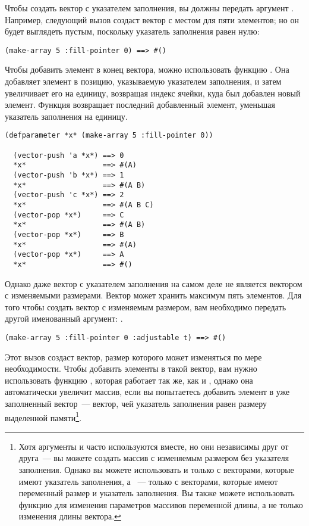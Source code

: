 Чтобы создать вектор с указателем заполнения, вы должны передать 
аргумент .  Например, следующий вызов  создаст вектор
с местом для пяти элементов; но он будет выглядеть пустым, поскольку указатель заполнения
равен нулю:

\begin{lstlisting}[style=lisprepl]
  (make-array 5 :fill-pointer 0) ==> #()
\end{lstlisting}

Чтобы добавить элемент в конец вектора, можно использовать функцию
.  Она добавляет элемент в позицию, указываемую указателем заполнения, и
затем увеличивает его на единицу, возвращая индекс ячейки, куда был добавлен новый
элемент.  Функция  возвращает последний добавленный элемент, уменьшая
указатель заполнения на единицу.

\begin{lstlisting}[style=lisprepl]
  (defparameter *x* (make-array 5 :fill-pointer 0))
  
  (vector-push 'a *x*) ==> 0
  *x*                  ==> #(A)
  (vector-push 'b *x*) ==> 1
  *x*                  ==> #(A B)
  (vector-push 'c *x*) ==> 2
  *x*                  ==> #(A B C)
  (vector-pop *x*)     ==> C
  *x*                  ==> #(A B)
  (vector-pop *x*)     ==> B
  *x*                  ==> #(A)
  (vector-pop *x*)     ==> A
  *x*                  ==> #()
\end{lstlisting}

Однако даже вектор с указателем заполнения на самом деле не является вектором с изменяемыми
размерами.  Вектор  может хранить максимум пять элементов.  Для того чтобы
создать вектор с изменяемым размером, вам необходимо передать  другой
именованный аргумент: .

\begin{lstlisting}[style=lisprepl]
  (make-array 5 :fill-pointer 0 :adjustable t) ==> #()
\end{lstlisting}

Этот вызов создаст вектор, размер которого может изменяться по мере необходимости.  Чтобы
добавить элементы в такой вектор, вам нужно использовать функцию
, которая работает так же, как и , однако
она автоматически увеличит массив, если вы попытаетесь добавить элемент в
уже заполненный вектор~--- вектор, чей указатель заполнения равен размеру выделенной
памяти\footnote{Хотя аргументы  и  часто используются
  вместе, но они независимы друг от друга~--- вы можете создать
  массив с изменяемым размером без указателя заполнения.  Однако вы можете использовать
   и  только с векторами, которые имеют указатель
  заполнения, а ~--- только с векторами, которые имеют переменный
  размер и указатель заполнения.  Вы также можете использовать функцию 
  для изменения параметров массивов переменной длины, а не только изменения длины
  вектора.}.


